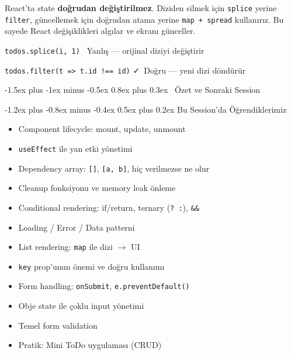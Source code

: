 \documentclass[12pt, a4paper]{article}
\makeatletter
\renewcommand{\section}{%
  \@startsection{section}{1}{\z@}%
    {-1.5ex plus -1ex minus -0.5ex}%
    {0.8ex plus 0.3ex}%
    {\normalfont\Large\bfseries\sffamily\color{primary}}%
}
\renewcommand{\subsection}{%
  \@startsection{subsection}{2}{\z@}%
    {-1.2ex plus -0.8ex minus -0.4ex}%
    {0.5ex plus 0.2ex}%
    {\normalfont\large\bfseries\sffamily\color{secondary}}%
}
\makeatother
\begin{document}
\vspace{6pt}

\begin{warningbox}
React'ta state \textbf{doğrudan değiştirilmez}. Diziden silmek için
\texttt{splice} yerine \texttt{filter}, güncellemek için doğrudan
atama yerine \texttt{map + spread} kullanırız. Bu sayede React
değişiklikleri algılar ve ekranı günceller.

\vspace{4pt}
\texttt{todos.splice(i, 1)} \quad\color{danger}\faTimes\ Yanlış --- orijinal diziyi değiştirir

\texttt{todos.filter(t => t.id !== id)} \quad\color{accent}\faCheck\ Doğru --- yeni dizi döndürür
\end{warningbox}

\newpage
\section{\faCheckCircle\ Özet ve Sonraki Session}

\subsection{Bu Session'da Öğrendiklerimiz}

\begin{tcolorbox}[enhanced, colback=lightbg, colframe=gray!30, arc=4pt]
\begin{itemize}
  \item[\color{accent}\faCheck] Component lifecycle: mount, update, unmount
  \item[\color{accent}\faCheck] \texttt{useEffect} ile yan etki yönetimi
  \item[\color{accent}\faCheck] Dependency array: \texttt{[]}, \texttt{[a, b]}, hiç verilmezse ne olur
  \item[\color{accent}\faCheck] Cleanup fonksiyonu ve memory leak önleme
  \item[\color{accent}\faCheck] Conditional rendering: if/return, ternary (\texttt{? :}), \texttt{\&\&}
  \item[\color{accent}\faCheck] Loading / Error / Data patterni
  \item[\color{accent}\faCheck] List rendering: \texttt{map} ile dizi $\rightarrow$ UI
  \item[\color{accent}\faCheck] \texttt{key} prop'unun önemi ve doğru kullanımı
  \item[\color{accent}\faCheck] Form handling: \texttt{onSubmit}, \texttt{e.preventDefault()}
  \item[\color{accent}\faCheck] Obje state ile çoklu input yönetimi
  \item[\color{accent}\faCheck] Temel form validation
  \item[\color{accent}\faCheck] Pratik: Mini ToDo uygulaması (CRUD)
\end{itemize}
\end{tcolorbox}
\end{document}

